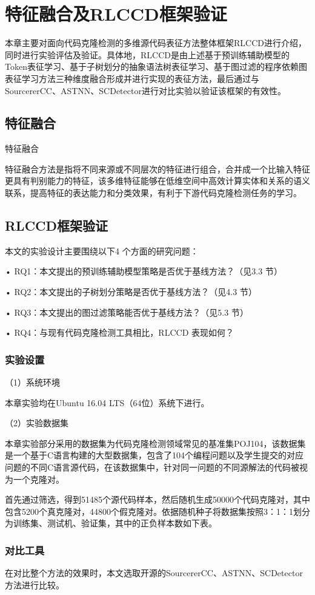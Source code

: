 \chapter{特征融合及RLCCD框架验证}
\label{chap:fusion}
本章主要对面向代码克隆检测的多维源代码表征方法整体框架RLCCD进行介绍，同时进行实验评估及验证。具体地，RLCCD是由上述基于预训练辅助模型的Token表征学习、基于子树划分的抽象语法树表征学习、基于图过滤的程序依赖图表征学习方法三种维度融合形成并进行实现的表征方法，最后通过与SourcererCC、ASTNN、SCDetector进行对比实验以验证该框架的有效性。
\section{特征融合}
特征融合

特征融合方法是指将不同来源或不同层次的特征进行组合，合并成一个比输入特征更具有判别能力的特征，该多维特征能够在低维空间中高效计算实体和关系的语义联系，提高特征的表达能力和分类效果，有利于下游代码克隆检测任务的学习。

\section{RLCCD框架验证}
本文的实验设计主要围绕以下4 个方面的研究问题：

• RQ1：本文提出的预训练辅助模型策略是否优于基线方法？（见3.3 节）

• RQ2：本文提出的子树划分策略是否优于基线方法？（见4.3 节）

• RQ3：本文提出的图过滤策略能否优于基线方法？（见5.3 节）

• RQ4：与现有代码克隆检测工具相比，RLCCD 表现如何？

\subsection{实验设置}
（1）系统环境

本章实验均在Ubuntu 16.04 LTS（64位）系统下进行。


（2）实验数据集

本章实验部分采用的数据集为代码克隆检测领域常见的基准集POJ104，该数据集是一个基于C语言构建的大型数据集，包含了104个编程问题以及学生提交的对应问题的不同C语言源代码，在该数据集中，针对同一问题的不同源解法的代码被视为一个克隆对。

首先通过筛选，得到51485个源代码样本，然后随机生成50000个代码克隆对，其中包含5200个真克隆对，44800个假克隆对。依据随机种子将数据集按照3：1：1划分为训练集、测试机、验证集，其中的正负样本数如下表。


\subsection{对比工具}
在对比整个方法的效果时，本文选取开源的SourcererCC、ASTNN、SCDetector方法进行比较。

